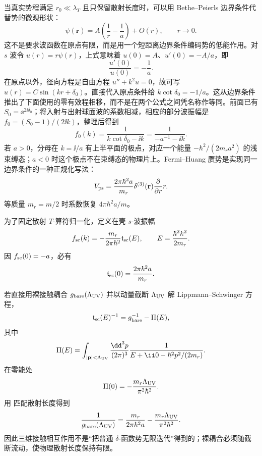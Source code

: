 当真实势程满足 \(r_0\ll\lambda_T\) 且只保留散射长度时，可以用 Bethe--Peierls 边界条件代替势的微观形状：
\begin{equation}
\psi(\mathbf r)
 =A\left(\frac1r-\frac1a\right)+O(r),
 \qquad r\to0.
 \label{eq:phys-sm-bethe-peierls}
\end{equation}
这不是要求波函数在原点有限，而是用一个短距离边界条件编码势的低能作用。对 $s$ 波令 $u(r)=r\psi(r)$，上式意味着 $u(0)=A$、$u'(0)=-A/a$，即
\[
\frac{u'(0)}{u(0)}=-\frac1a.
\]
在原点以外，径向方程是自由方程 $u''+k^2u=0$，故可写 $u(r)=C\sin(kr+\delta_0)$。直接代入原点条件给 $k\cot\delta_0=-1/a$。这从边界条件推出了下面使用的零有效程相移，而不是在两个公式之间凭名称作等同。前面已有 $S_0=\ee^{2\ii\delta_0}$；将入射与出射球面波的系数相减，相应的部分波振幅是 $f_0=(S_0-1)/(2\ii k)$，整理后得到
\[
f_0(k)=\frac1{k\cot\delta_0-\ii k}
=\frac1{-a^{-1}-\ii k}.
\]
若 $a>0$，分母在 $k=\ii/a$ 有上半平面的极点，对应一个能量 $-\hbar^2/(2m_ra^2)$ 的浅束缚态；$a<0$ 时这个极点不在束缚态的物理片上。Fermi--Huang 赝势是实现同一边界条件的一种正规化写法：
\begin{equation}
 V_{\rm ps}
 =\frac{2\pi\hbar^2a}{m_r}
 \delta^{(3)}(\mathbf r)
 \frac{\partial}{\partial r}r.
 \label{eq:phys-sm-s-wave-pseudo}
\end{equation}
等质量 \(m_r=m/2\) 时系数恢复 \(4\pi\hbar^2a/m\)。

为了固定散射 \(T\)-算符归一化，定义在壳 \(s\)-波振幅
\begin{equation}
 f_{\rm sc}(k)
 =-\frac{m_r}{2\pi\hbar^2}
 \mathfrak t_{\rm sc}(E),
 \qquad
 E=\frac{\hbar^2k^2}{2m_r}.
 \label{eq:phys-sm-scattering-t-normalization}
\end{equation}
因 \(f_{\rm sc}(0)=-a\)，必有
\begin{equation}
 \mathfrak t_{\rm sc}(0)
 =\frac{2\pi\hbar^2a}{m_r}.
 \label{eq:phys-sm-contact-coupling}
\end{equation}

若直接用裸接触耦合 \(g_{\rm bare}(\Lambda_{\rm UV})\) 并以动量截断 \(\Lambda_{\rm UV}\) 解 Lippmann--Schwinger 方程，
\[
 \mathfrak t_{\rm sc}(E)^{-1}
 =g_{\rm bare}^{-1}-\Pi(E),
\]
其中
\[
 \Pi(E)=\int_{|\mathbf p|<\Lambda_{\rm UV}}
 \frac{\dd^3p}{(2\pi)^3}
 \frac{1}{E+\ii0-\hbar^2p^2/(2m_r)}.
\]
在零能处
\[
 \Pi(0)=-\frac{m_r\Lambda_{\rm UV}}{\pi^2\hbar^2}.
\]
用 匹配散射长度得到
\begin{equation}
 \frac1{g_{\rm bare}(\Lambda_{\rm UV})}
 =\frac{m_r}{2\pi\hbar^2a}
 -\frac{m_r\Lambda_{\rm UV}}{\pi^2\hbar^2}.
 \label{eq:phys-sm-contact-renormalization}
\end{equation}
因此三维接触相互作用不是“把普通 \(\delta\)-函数势无限迭代”得到的；裸耦合必须随截断流动，使物理散射长度保持有限。

